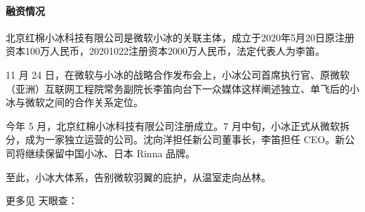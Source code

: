 \documentclass[letterpaper,10pt,english]{sphinxmanual}
\begin{document}
\paragraph{融资情况}
\label{\detokenize{chapter_AI_company/xiaoice:id8}}
北京红棉小冰科技有限公司是微软小冰的关联主体，成立于2020年5月20日原注册资本100万人民币，2020\sphinxhyphen{}10\sphinxhyphen{}22注册资本2000万人民币，法定代表人为李笛。%
\begin{footnote}[1060]\sphinxAtStartFootnote
{}
%
\end{footnote}

11 月 24
日，在微软与小冰的战略合作发布会上，小冰公司首席执行官、原微软（亚洲）互联网工程院常务副院长李笛向台下一众媒体这样阐述独立、单飞后的小冰与微软之间的合作关系定位。

今年 5 月，北京红棉小冰科技有限公司注册成立。7
月中旬，小冰正式从微软拆分，成为一家独立运营的公司。沈向洋担任新公司董事长，李笛担任
CEO。新公司将继续保留中国小冰、日本 Rinna 品牌。

至此，小冰大体系，告别微软羽翼的庇护，从温室走向丛林。

更多见 天眼查：
\end{document}
